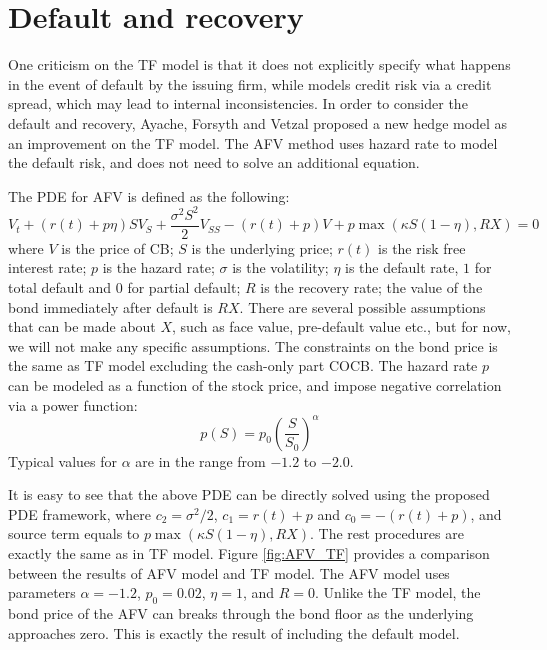 \documentclass[12pt]{article}
\begin{document}
\section{Default and recovery}
One criticism on the TF model is that it does not explicitly specify what happens in the event of default by the issuing firm, while models credit risk via a credit spread, which may lead to internal inconsistencies. In order to consider the default and recovery, Ayache, Forsyth and Vetzal proposed a new hedge model as an improvement on the TF model. The AFV method uses hazard rate to model the default risk, and does not need to solve an additional equation. 

The PDE for AFV is defined as the following:
\begin{equation}
V_t + (r(t) + p\eta)SV_S + \frac{\sigma^2S^2}{2}V_{SS} - (r(t)+p)V + p\max(\kappa S(1-\eta), RX) = 0
\label{eq:AFV_eqn}
\end{equation}
where $V$ is the price of CB; $S$ is the underlying price; $r(t)$ is the risk free interest rate; $p$ is the hazard rate; $\sigma$ is the volatility; $\eta$ is the default rate, $1$ for total default and $0$ for partial default; $R$ is the recovery rate; the value of the bond immediately after default is $RX$. There are several possible assumptions that can be made about $X$, such as face value, pre-default value etc., but for now, we will not make any specific assumptions. The constraints on the bond price is the same as TF model excluding the cash-only part COCB. The hazard rate $p$ can be modeled as a function of the stock price, and impose negative correlation via a power function:
\begin{equation}
p(S) = p_0(\frac{S}{S_0})^\alpha
\label{eq:hazard_rate}
\end{equation}
Typical values for $\alpha$ are in the range from $-1.2$ to $-2.0$.

It is easy to see that the above PDE can be directly solved using the proposed PDE framework, where $c_2 = \sigma^2/2$, $c_1 = r(t)+ p$ and $c_0 = -(r(t)+p)$, and source term equals to $p\max(\kappa S(1-\eta), RX)$. The rest procedures are exactly the same as in TF model. Figure \ref{fig:AFV_TF} provides a comparison between the results of AFV model and TF model. The AFV model uses parameters $\alpha = -1.2$, $p_0 = 0.02$, $\eta = 1$, and $R = 0$. Unlike the TF model, the bond price of the AFV can breaks through the bond floor as the underlying approaches zero. This is exactly the result of including the default model.
\end{document}
